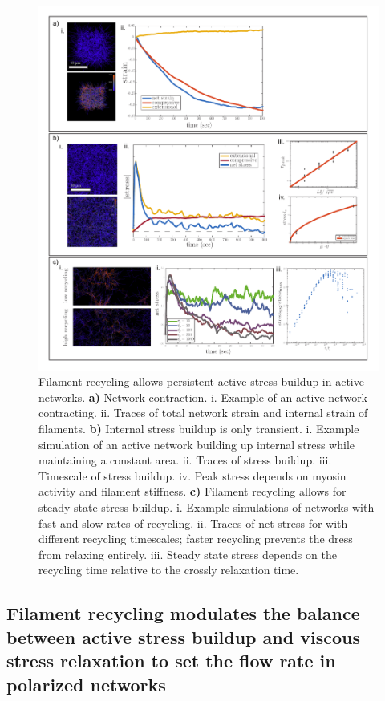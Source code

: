 \documentclass[10pt,letterpaper]{article}
\begin{document}
\begin{figure}[h!]
\centering
\includegraphics[width=\hsize]{figures/fig4/fig4}
\caption{\label{fig:active} Filament recycling allows persistent active stress buildup in active networks.  \textbf{a)} Network contraction. i. Example of an active network contracting. ii. Traces of total network strain and internal strain of filaments. \textbf{b)} Internal stress buildup is only transient. i. Example simulation of an active network building up internal stress while maintaining a constant area. ii. Traces of stress buildup. iii. Timescale of stress buildup. iv. Peak stress depends on myosin activity and filament stiffness. \textbf{c)} Filament recycling allows for steady state stress buildup. i. Example simulations of networks with fast and slow rates of recycling. ii. Traces of net stress for with different recycling timescales; faster recycling prevents the dress from relaxing entirely.  iii. Steady state stress depends on the recycling time relative to the crossly relaxation time. }
\end{figure}

\subsection*{Filament recycling modulates the balance between active stress buildup and viscous stress relaxation to set the flow rate in polarized networks}
\end{document}
